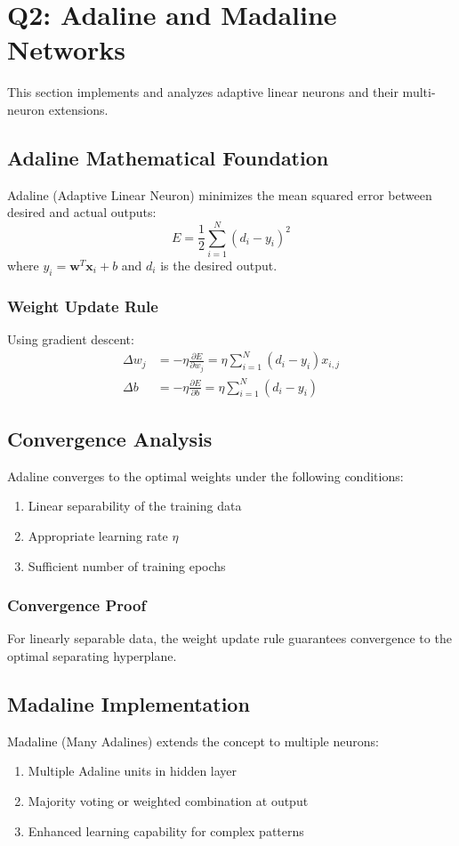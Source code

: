 \documentclass[conference]{IEEEtran}
\begin{document}
\section{Q2: Adaline and Madaline Networks}\label{sec:q2}
This section implements and analyzes adaptive linear neurons and their multi-neuron extensions.

\subsection{Adaline Mathematical Foundation}
Adaline (Adaptive Linear Neuron) minimizes the mean squared error between desired and actual outputs:
\begin{equation}
E = \frac{1}{2} \sum_{i=1}^{N} (d_i - y_i)^2
\end{equation}
where $y_i = \mathbf{w}^T \mathbf{x}_i + b$ and $d_i$ is the desired output.

\subsubsection{Weight Update Rule}
Using gradient descent:
\begin{align}
\Delta w_j &= -\eta \frac{\partial E}{\partial w_j} = \eta \sum_{i=1}^{N} (d_i - y_i) x_{i,j} \\
\Delta b &= -\eta \frac{\partial E}{\partial b} = \eta \sum_{i=1}^{N} (d_i - y_i)
\end{align}

\subsection{Convergence Analysis}
Adaline converges to the optimal weights under the following conditions:
\begin{enumerate}
    \item Linear separability of the training data
    \item Appropriate learning rate $\eta$
    \item Sufficient number of training epochs
\end{enumerate}

\subsubsection{Convergence Proof}
For linearly separable data, the weight update rule guarantees convergence to the optimal separating hyperplane.

\subsection{Madaline Implementation}
Madaline (Many Adalines) extends the concept to multiple neurons:
\begin{enumerate}
    \item Multiple Adaline units in hidden layer
    \item Majority voting or weighted combination at output
    \item Enhanced learning capability for complex patterns
\end{enumerate}
\end{document}
